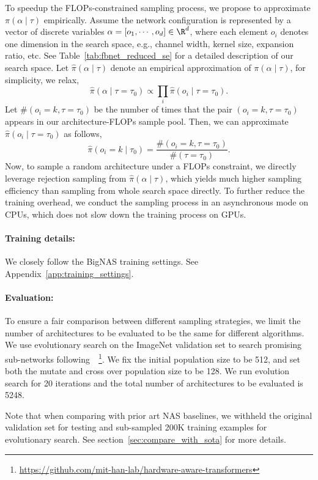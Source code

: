 \documentclass[final]{cvpr}
\theoremstyle{definition}
\begin{document}
To speedup the FLOPs-constrained sampling process, we propose to approximate $\pi(\alpha\mid\tau)$ empirically.
Assume the network configuration is represented by a vector of discrete variables $\alpha = [o_1, \cdots, o_d] \in \R^d$,
where each element $o_i$ denotes one dimension in the search space, 
e.g., channel width, kernel size, expansion ratio, etc.
See Table~\ref{tab:fbnet_reduced_se} for a detailed description of our search space. 
Let $\hat{\pi}(\alpha\mid\tau)$ denote an empirical approximation of $\pi(\alpha\mid\tau)$, 
for simplicity, we relax, 
$$
\hat{\pi}(\alpha \mid \tau = \tau_0) \propto \prod_i \hat{\pi}(o_i \mid \tau = \tau_0).
$$
Let  $\#(o_i=k, \tau=\tau_0)$ be the number of 
times that the pair $(o_i=k, \tau=\tau_0)$ appears in our architecture-FLOPs sample pool. Then, we can approximate $\hat{\pi}(o_i \mid \tau = \tau_0)$ as follows,
$$
\hat{\pi}(o_i = k \mid \tau_0) = \frac{\#(o_i=k, \tau=\tau_0)}{\#(\tau = \tau_0)}.
$$
Now, to sample a random architecture under a FLOPs constraint, we directly leverage rejection sampling from $\hat{\pi}(\alpha\mid \tau)$, which yields much higher sampling efficiency than sampling from whole search space directly. To further reduce the training overhead, we conduct the sampling process in an asynchronous mode on CPUs, which does not slow down the training process on GPUs.


\paragraph{Training details:}
We closely follow the BigNAS \cite{yu2020bignas} training settings. 
See  Appendix~\ref{app:training_settings}. 


\paragraph{Evaluation:}
To ensure a fair comparison between different sampling strategies, 
we limit the number of architectures to be evaluated to be the same for different algorithms. 
We use evolutionary search on the ImageNet validation set to search promising sub-networks following~\cite{wang2020hat}~\footnote{\url{https://github.com/mit-han-lab/hardware-aware-transformers}}.
We fix the initial population size to be 512,
and set both the mutate and cross over population size to be 128.
We run evolution search for 20 iterations and the total number of architectures to be evaluated is 5248. 

Note that when comparing with prior art NAS baselines, we
withheld the original validation set for testing 
and sub-sampled 200K training examples for evolutionary search. 
See section~\ref{sec:compare_with_sota} for more details.
\end{document}
